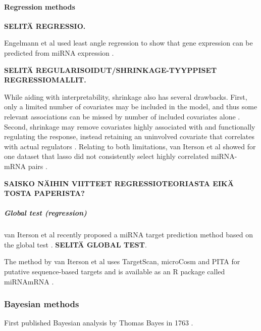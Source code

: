 \paragraph{Regression methods}\label{regression-methods}

\textbf{SELITÄ REGRESSIO.}

Engelmann et al used least angle regression to show that gene expression can
be predicted from miRNA expression \citep{Engelmann}.

\textbf{SELITÄ REGULARISOIDUT/SHRINKAGE-TYYPPISET REGRESSIOMALLIT.}

While aiding with interpretability, shrinkage also has several drawbacks.
First, only a limited number of covariates may be included in the model, and
thus some relevant associations can be missed by number of included covariates
alone \citep{vanIterson2013}. Second, shrinkage may remove covariates highly
associated with and functionally regulating the response, instead retaining an
uninvolved covariate that correlates with actual regulators \citep{Engelmann}.
Relating to both limitations, van Iterson et al showed for one dataset that
lasso did not consistently select highly correlated miRNA-mRNA pairs
\citep{vanIterson2013}.

\textbf{SAISKO NÄIHIN VIITTEET REGRESSIOTEORIASTA EIKÄ TOSTA PAPERISTA?}


\subparagraph{Global test (regression)}\label{global-test-regression}

van Iterson et al recently proposed a miRNA target prediction method based on
the global test \citep{vanIterson2013}. \textbf{SELITÄ GLOBAL TEST}.

The method by van Iterson et al uses TargetScan, microCosm and PITA for
putative sequence-based targets and is available as an R package called
miRNAmRNA \citep{vanItersonWeb}.





\subsubsection{Bayesian methods}\label{bayesian-methods}

First published Bayesian analysis by Thomas Bayes in 1763 \citep{Gelman2013}.


